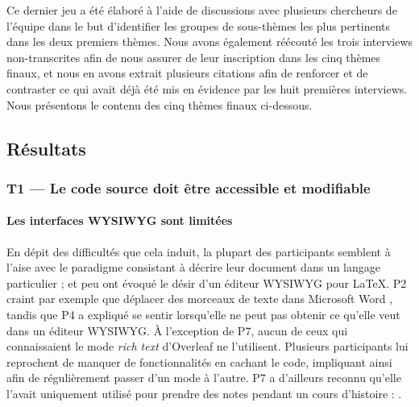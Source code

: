 Ce dernier jeu a été élaboré à l'aide de discussions avec plusieurs chercheurs de l'équipe dans le but d'identifier les groupes de sous-thèmes les plus pertinents dans les deux premiers thèmes.
Nous avons également réécouté les trois interviews non-transcrites afin de nous assurer de leur inscription dans les cinq thèmes finaux, et nous en avons extrait plusieurs citations afin de renforcer et de contraster ce qui avait déjà été mis en évidence par les huit premières interviews.
Nous présentons le contenu des cinq thèmes finaux ci-dessous.




\subsection{Résultats}

\subsubsection{T1 --- Le code source doit être accessible et modifiable}

\paragraph{Les interfaces WYSIWYG sont limitées}
En dépit des difficultés que cela induit, la plupart des participants semblent à l'aise avec le paradigme consistant à décrire leur document dans un langage particulier ; et peu ont évoqué le désir d'un éditeur WYSIWYG pour \LaTeX{}.
P2 craint par exemple que déplacer des morceaux de texte dans Microsoft Word , tandis que P4 a expliqué se sentir  lorsqu'elle ne peut pas obtenir ce qu'elle veut dans un éditeur WYSIWYG.
À l'exception de P7, aucun de ceux qui connaissaient le mode \emph{rich text} d'Overleaf ne l'utilisent.
Plusieurs participants lui reprochent de manquer de fonctionnalités en cachant le code, impliquant ainsi  afin de régulièrement passer d'un mode à l'autre.
P7 a d'ailleurs reconnu qu'elle l'avait uniquement utilisé pour prendre des notes pendant un cours d'histoire : .

